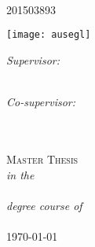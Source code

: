 \documentclass[
11pt, %
english, %
singlespacing, %
headsepline, %
]{MastersDoctoralThesis} %
\author{Riccardo Di Lorenzo} %
\begin{document}
\frontmatter %

\pagestyle{plain} %


\begin{titlepage}
\begin{center}
{\scshape\LARGE \univname\par}\vspace{1cm} %
\HRule \\[0.4cm] %
{\huge \bfseries \ttitle\par}\vspace{0.4cm} %
\HRule \\[1cm] %

{\LARGE{\textsc{\authorname}}}\\
\vspace{3mm}
{\textsc{201503893}}\par
\vfill 
\vspace{6mm}
\texttt{[image: ausegl]}	
			\vfill \vfill
 \vspace{6mm}
\begin{minipage}[t]{0.4\textwidth}
\begin{flushleft} \large
\emph{Supervisor:} \\
\supname \\
\end{flushleft}
\end{minipage}
\begin{minipage}[t]{0.4\textwidth}
\begin{flushright} \large

\emph{Co-supervisor:} \\
\cosupname \\
\end{flushright}
\end{minipage}\\[1.5cm]
 
\textsc{\Large Master Thesis}\\[0.3cm] %
\textit{in the}\\[0.3cm]
\deptname\\[0.3cm] %
\textit{degree course of}\\[0.3cm]
\facname \\
\vfill
\vspace{1cm}
{\large \today}\\

\vfill
\end{center}
\end{titlepage}
\end{document}
